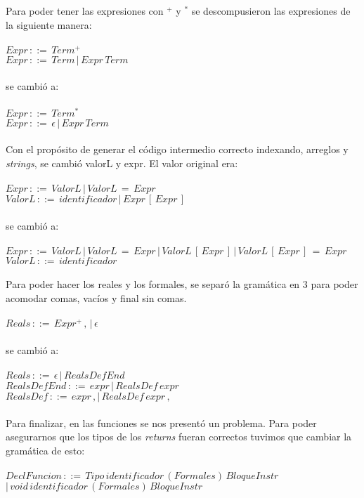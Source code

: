 \documentclass[11pt]{article}
\begin{document}
Para poder tener las expresiones con $^+$ y $^*$ se descompusieron las expresiones de la siguiente manera:
\\\\
$Expr\,::=\,Term^+$
\\
$Expr\,::=\,Term\,|\,Expr\,Term$
\\\\
se cambió a:
\\\\
$Expr\,::=\,Term^*$
\\
$Expr\,::=\,\epsilon\,|\,Expr\,Term$
\\\\
Con el propósito de generar el código intermedio correcto indexando, arreglos y \textit{strings},  se cambió  valorL y expr. El valor original era:
\\\\
$Expr\,::=\,ValorL\,|\,ValorL\,=\,Expr$
\\
$ValorL\,::=\,identificador\,|\,Expr\,[\,Expr\,]$
\\\\
se cambió a:
\\\\
$Expr\,::=\,ValorL\,|\,ValorL\,=\,Expr\,|\,ValorL\,[\,Expr\,]\,|\,ValorL\,[\,Expr\,]\,=\,Expr$
\\
$ValorL\,::=\,identificador$
\\\\
Para poder hacer los reales y los formales, se separó la gramática en 3 para poder acomodar comas, vacíos y final sin comas.
\\\\
$Reals\,::=\,Expr^+\,,\,|\,\epsilon$
\\\\
se cambió a:
\\\\
$Reals\,::=\,\epsilon\,|\,RealsDefEnd$
\\
$RealsDefEnd\,::=\,expr\,|\,RealsDef\,expr$
\\
$RealsDef\,::=\,expr\,,|\,RealsDef\,expr\,,$
\\\\
Para finalizar, en las funciones se nos presentó un problema. Para poder asegurarnos que los tipos de los \textit{returns} fueran correctos tuvimos que cambiar la gramática de esto:
\\\\
$DeclFuncion\,::=\,Tipo\,identificador\,(Formales)\,BloqueInstr$
\\
$|\,void \,identificador\,(Formales)\,BloqueInstr$
\end{document}
